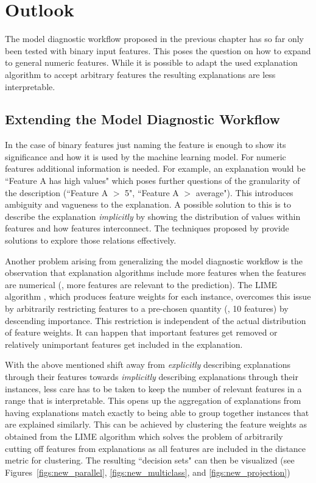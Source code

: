 \chapter{Outlook}
\label{chap:current}
The model diagnostic workflow proposed in the previous chapter has so far only been tested with binary input features.
This poses the question on how to expand to general numeric features.
While it is possible to adapt the used explanation algorithm to accept arbitrary features the resulting explanations are less interpretable.




\section{Extending the Model Diagnostic Workflow}
In the case of binary features just naming the feature is enough to show its significance and how it is used by the machine learning model.
For numeric features additional information is needed.
For example, an explanation would be ``Feature A has high values" which poses further questions of the granularity of the description (``Feature A $>$ 5", ``Feature A $>$ average").
This introduces ambiguity and vagueness to the explanation.
A possible solution to this is to describe the explanation \emph{implicitly} by showing the distribution of values within features and how features interconnect.
The techniques proposed by \cite{seekaview} provide solutions to explore those relations effectively.

Another problem arising from generalizing the model diagnostic workflow is the observation that explanation algorithms include more features when the features are numerical (\ie, more features are relevant to the prediction).
The LIME algorithm \cite{DBLP:journals/corr/RibeiroSG16}, which produces feature weights for each instance, overcomes this issue by arbitrarily restricting features to a pre-chosen quantity (\eg, 10 features) by descending importance.
This restriction is independent of the actual distribution of feature weights.
It can happen that important features get removed or relatively unimportant features get included in the explanation.



With the above mentioned shift away from \emph{explicitly} describing explanations through their features towards \emph{implicitly} describing explanations through their instances, less care has to be taken to keep the number of relevant features in a range that is interpretable.
This opens up the aggregation of explanations from having explanations match exactly to being able to group together instances that are explained similarly.
This can be achieved by clustering the feature weights as obtained from the LIME algorithm which solves the problem of arbitrarily cutting off features from explanations as all features are included in the distance metric for clustering.
The resulting ``decision sets" can then be visualized (see Figures~\ref{figs:new_parallel}, \ref{figs:new_multiclass}, and \ref{figs:new_projection})
\vspace*{-0.5em}

